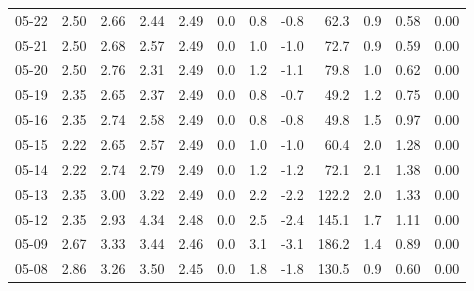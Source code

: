 \begin{threeparttable}
{\begin{tabular}{lrrrrrrrrrrr}
  05-22 &          2.50 &          2.66 &          2.44 &        2.49 &                 0.0 &                 0.8 &       -0.8 &                62.3 &              0.9 &            0.58 &                   0.00 \\
  05-21 &          2.50 &          2.68 &          2.57 &        2.49 &                 0.0 &                 1.0 &       -1.0 &                72.7 &              0.9 &            0.59 &                   0.00 \\
  05-20 &          2.50 &          2.76 &          2.31 &        2.49 &                 0.0 &                 1.2 &       -1.1 &                79.8 &              1.0 &            0.62 &                   0.00 \\
  05-19 &          2.35 &          2.65 &          2.37 &        2.49 &                 0.0 &                 0.8 &       -0.7 &                49.2 &              1.2 &            0.75 &                   0.00 \\
  05-16 &          2.35 &          2.74 &          2.58 &        2.49 &                 0.0 &                 0.8 &       -0.8 &                49.8 &              1.5 &            0.97 &                   0.00 \\
  05-15 &          2.22 &          2.65 &          2.57 &        2.49 &                 0.0 &                 1.0 &       -1.0 &                60.4 &              2.0 &            1.28 &                   0.00 \\
  05-14 &          2.22 &          2.74 &          2.79 &        2.49 &                 0.0 &                 1.2 &       -1.2 &                72.1 &              2.1 &            1.38 &                   0.00 \\
  05-13 &          2.35 &          3.00 &          3.22 &        2.49 &                 0.0 &                 2.2 &       -2.2 &               122.2 &              2.0 &            1.33 &                   0.00 \\
  05-12 &          2.35 &          2.93 &          4.34 &        2.48 &                 0.0 &                 2.5 &       -2.4 &               145.1 &              1.7 &            1.11 &                   0.00 \\
  05-09 &          2.67 &          3.33 &          3.44 &        2.46 &                 0.0 &                 3.1 &       -3.1 &               186.2 &              1.4 &            0.89 &                   0.00 \\
  05-08 &          2.86 &          3.26 &          3.50 &        2.45 &                 0.0 &                 1.8 &       -1.8 &               130.5 &              0.9 &            0.60 &                   0.00 \\

\end{tabular}}
\end{threeparttable}
